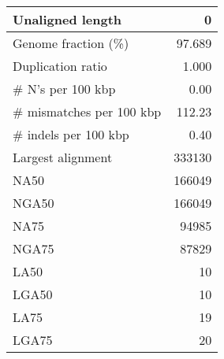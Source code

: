 \documentclass[12pt,a4paper]{article}
\begin{document}
\begin{table}[ht]
\begin{center}
\begin{tabular}{|l*{1}{|r}|}
Unaligned length & 0 \\ \hline
Genome fraction (\%) & 97.689 \\ \hline
Duplication ratio & 1.000 \\ \hline
\# N's per 100 kbp & 0.00 \\ \hline
\# mismatches per 100 kbp & 112.23 \\ \hline
\# indels per 100 kbp & 0.40 \\ \hline
Largest alignment & 333130 \\ \hline
NA50 & 166049 \\ \hline
NGA50 & 166049 \\ \hline
NA75 & 94985 \\ \hline
NGA75 & 87829 \\ \hline
LA50 & 10 \\ \hline
LGA50 & 10 \\ \hline
LA75 & 19 \\ \hline
LGA75 & 20 \\ \hline
\end{tabular}
\end{center}
\end{table}
\end{document}

